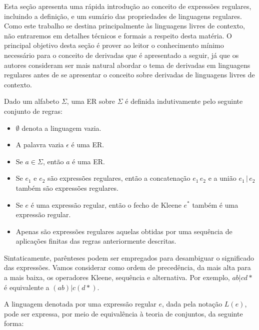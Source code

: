 Esta seção apresenta uma rápida introdução ao conceito de expressões regulares, incluindo a definição, e um sumário das propriedades de linguagens regulares. Como este trabalho se destina principalmente às linguagens livres de contexto, não entraremos em detalhes técnicos e formais a respeito desta matéria. O principal objetivo desta seção é prover ao leitor o conhecimento mínimo necessário para o conceito de derivadas que é apresentado a seguir, já que os autores consideram ser mais natural abordar o tema de derivadas em linguagens regulares antes de se apresentar o conceito sobre derivadas de linguagens livres de contexto.

Dado um alfabeto $\Sigma$, uma \ac{ER} sobre $\Sigma$ é definida indutivamente pelo seguinte conjunto de regras:

\begin{itemize}
 \item $\emptyset$ denota a linguagem vazia.
 \item A palavra vazia $\epsilon$ é uma \ac{ER}.
 \item Se $a \in \Sigma$, então $a$ é uma \ac{ER}.
 \item Se $e_1$ e $e_2$ são expressões regulares, então a concatenação $e_1\,e_2$ e a união $e_1\, |\,e_2$ também são expressões regulares.
 \item Se $e$ é uma expressão regular, então o fecho de Kleene $e^*$ também é uma expressão regular.
 \item Apenas são expressões regulares aquelas obtidas por uma sequência de aplicações finitas das regras anteriormente descritas.
\end{itemize}

Sintaticamente, parênteses podem ser empregados para desambiguar o significado das expressões. Vamos considerar como ordem de precedência, da mais alta para a mais baixa, os operadores Kleene, sequência e alternativa. Por exemplo, $ab|cd*$ é equivalente a $(ab)|c(d*)$.

A linguagem denotada por uma expressão regular $e$, dada pela notação $L(e)$, pode ser expressa, por meio de equivalência à teoria de conjuntos, da seguinte forma:


